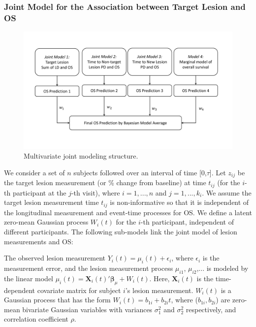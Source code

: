 \subsubsection{Joint Model for the Association between Target Lesion and OS} \label{sec:TL}


\begin{figure}
\centering
\includegraphics[width=\textwidth]{chapters/figures/JM.pdf}
\caption{Multivariate joint modeling structure.} 
\label{fig:JM}
\end{figure}


We consider a set of $n$ subjects followed over an interval of time [0,$\tau$]. Let $z_{ij}$ be the target lesion measurement (or \% change from baseline) at time $t_{ij}$ (for the $i$-th participant at the $j$-th visit), where $i=1,...,n$ and $j=1,...,k_i$. We assume the target lesion measurement time $t_{ij}$ is non-informative so that it is independent of the longitudinal measurement and event-time processes for OS. We define a latent zero-mean Gaussian process $W_i(t)$ for the $i$-th participant, independent of different participants. The following sub-models link the joint model of lesion measurements and OS:

The observed lesion measurement
$Y_{i}(t)=\mu_{i}(t)+\epsilon_i$,
where $\epsilon_i$ is the measurement error, and the lesion measurement process $\mu_{i1}$, $\mu_{i2}$,...
is modeled by the linear model
$\mu_{i}(t)=\textbf{X}_i(t)' \boldsymbol{\beta}_{\mu}+W_{i}(t)$. Here, $\textbf{X}_i(t)$ is the time-dependent covariate matrix for subject $i$'s lesion measurement. $W_i(t)$ is a Gaussian process that has the form $W_{i}(t)=b_{1i}+b_{2i}t$,
where ($b_{1i},b_{2i}$) are zero-mean bivariate Gaussian variables with variances $\sigma_1^2$ and $\sigma_2^2$ respectively, and correlation coefficient $\rho$. 

